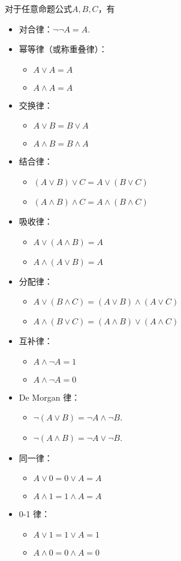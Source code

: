 \begin{theorem}[基本等值式]
对于任意命题公式\(A,B,C\)，有\begin{itemize}
	\item {\rm 对合律}：\(\neg\neg A = A\).
	\item {\rm 幂等律}（或称{\rm 重叠律}）：\begin{itemize}
		\item \(A \lor A = A\)
		\item \(A \land A = A\)
	\end{itemize}
	\item {\rm 交换律}：\begin{itemize}
		\item \(A \lor B = B \lor A\)
		\item \(A \land B = B \land A\)
	\end{itemize}
	\item {\rm 结合律}：\begin{itemize}
		\item \((A \lor B) \lor C = A \lor (B \lor C)\)
		\item \((A \land B) \land C = A \land (B \land C)\)
	\end{itemize}
	\item {\rm 吸收律}：\begin{itemize}
		\item \(A \lor (A \land B) = A\)
		\item \(A \land (A \lor B) = A\)
	\end{itemize}
	\item {\rm 分配律}：\begin{itemize}
		\item \(A \lor (B \land C) = (A \lor B) \land (A \lor C)\)
		\item \(A \land (B \lor C) = (A \land B) \lor (A \land C)\)
	\end{itemize}
	\item {\rm 互补律}：\begin{itemize}
		\item \(A \land \neg A = 1\)
		\item \(A \land \neg A = 0\)
	\end{itemize}
	\item {\rm De Morgan 律}：\begin{itemize}
		\item \(\neg(A \lor B) = \neg A \land \neg B\).
		\item \(\neg(A \land B) = \neg A \lor \neg B\).
	\end{itemize}
	\item {\rm 同一律}：\begin{itemize}
		\item \(A \lor 0 = 0 \lor A = A\)
		\item \(A \land 1 = 1 \land A = A\)
	\end{itemize}
	\item {\rm 0-1 律}：\begin{itemize}
		\item \(A \lor 1 = 1 \lor A = 1\)
		\item \(A \land 0 = 0 \land A = 0\)
	\end{itemize}
\end{itemize}
\end{theorem}
